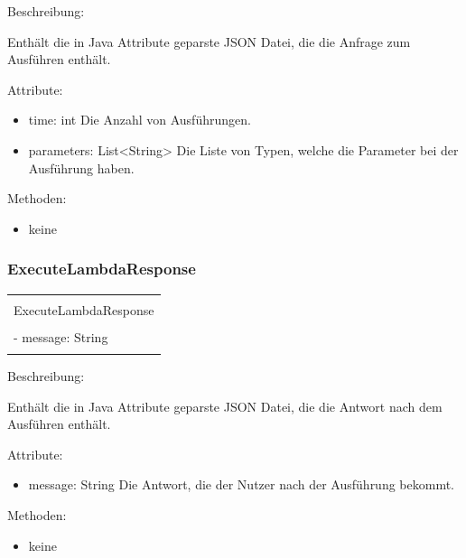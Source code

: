 \documentclass[a4paper,20pt,oneside]{book}
\begin{document}
	
	\vspace{0.5cm}
	\raggedright
	
	Beschreibung:	
	
	Enthält die in Java Attribute geparste JSON Datei, die die Anfrage zum Ausführen enthält.
	\vspace{0.5cm}
	
	Attribute:
	\begin{itemize}
	\item time: int\linebreak
	Die Anzahl von Ausführungen.
	\item parameters: List<String> \linebreak	
	Die Liste von Typen, welche die Parameter bei der Ausführung haben.  
	\end{itemize}
	
	Methoden:
	\begin{itemize}
	\item keine
	\end{itemize}
	\subsubsection{ExecuteLambdaResponse}
		\centering
	\begin{tabular}{|l|}
	\hline \\
	ExecuteLambdaResponse\\
	\hline \\
	- message: String\\
    \hline \\
	\hline 
	\end{tabular}
	
	
	\vspace{0.5cm}
	\raggedright
	
	Beschreibung:
		
	Enthält die in Java Attribute geparste JSON Datei, die die Antwort nach dem Ausführen enthält.
	\vspace{0.5cm}
	
	Attribute:
	\begin{itemize}
	\item message: String\linebreak
	Die Antwort, die der Nutzer nach der Ausführung bekommt.
		
	\end{itemize}
	
	Methoden:
	\begin{itemize}
	\item keine
	\end{itemize}
\end{document}
